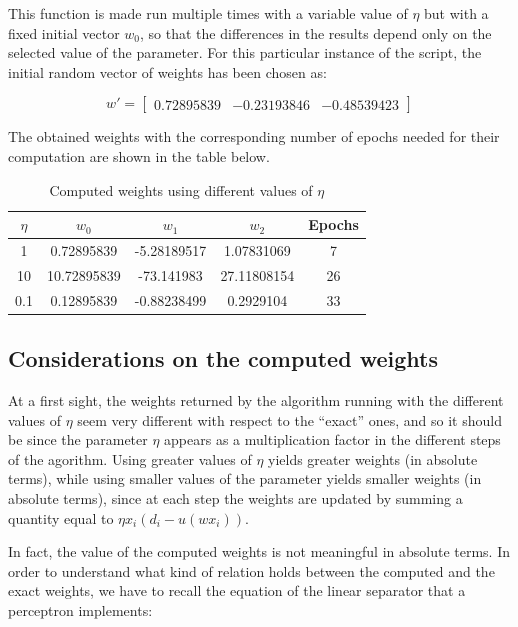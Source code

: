 \documentclass[letterpaper,headings=standardclasses]{scrartcl}
\begin{document}
This function is made run multiple times with a variable value of $\eta$ but with a fixed initial vector $w_0$, so that the differences in the results depend only on the selected value of the parameter. For this particular instance of the script, the initial random vector of weights has been chosen as:

$$ w' = [\begin{matrix} 0.72895839 & -0.23193846 & -0.48539423 \end{matrix}] $$

The obtained weights with the corresponding number of epochs needed for their computation are shown in the table below.

\begin{table}[h]
\centering
\begin{tabular}{|c|c|c|c|c|}
\hline
$\eta$ & $w_0$       & $w_1$        & $w_2$       & Epochs \\ \hline
1      & 0.72895839  & -5.28189517  & 1.07831069  & 7      \\ \hline
10     & 10.72895839 & -73.141983   & 27.11808154 & 26     \\ \hline
0.1    & 0.12895839  & -0.88238499  & 0.2929104   & 33     \\ \hline
\end{tabular}
\caption{Computed weights using different values of $\eta$}
\end{table}

\subsection{Considerations on the computed weights}

At a first sight, the weights returned by the algorithm running with the different values of $\eta$ seem very different with respect to the “exact” ones, and so it should be since the parameter $\eta$ appears as a multiplication factor in the different steps of the agorithm. Using greater values of $\eta$ yields greater weights (in absolute terms), while using smaller values of the parameter yields smaller weights (in absolute terms), since at each step the weights are updated by summing a quantity equal to $\eta x_i (d_i - u(w x_i))$.

In fact, the value of the computed weights is not meaningful in absolute terms. In order to understand what kind of relation holds between the computed and the exact weights, we have to recall the equation of the linear separator that a perceptron implements:
\end{document}
